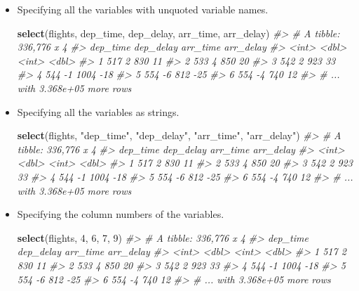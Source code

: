\documentclass[]{book}
\newenvironment{Shaded}{\begin{snugshade}}{\end{snugshade}}
\newcommand{\CommentTok}[1]{\textcolor[rgb]{0.56,0.35,0.01}{\textit{#1}}}
\newcommand{\DecValTok}[1]{\textcolor[rgb]{0.00,0.00,0.81}{#1}}
\newcommand{\KeywordTok}[1]{\textcolor[rgb]{0.13,0.29,0.53}{\textbf{#1}}}
\newcommand{\NormalTok}[1]{#1}
\newcommand{\StringTok}[1]{\textcolor[rgb]{0.31,0.60,0.02}{#1}}
\theoremstyle{plain}
\theoremstyle{remark}
\begin{document}
\begin{itemize}
\item
  Specifying all the variables with unquoted variable names.

\begin{Shaded}
\begin{Highlighting}[]
\KeywordTok{select}\NormalTok{(flights, dep_time, dep_delay, arr_time, arr_delay)}
\CommentTok{#> # A tibble: 336,776 x 4}
\CommentTok{#>   dep_time dep_delay arr_time arr_delay}
\CommentTok{#>      <int>     <dbl>    <int>     <dbl>}
\CommentTok{#> 1      517         2      830        11}
\CommentTok{#> 2      533         4      850        20}
\CommentTok{#> 3      542         2      923        33}
\CommentTok{#> 4      544        -1     1004       -18}
\CommentTok{#> 5      554        -6      812       -25}
\CommentTok{#> 6      554        -4      740        12}
\CommentTok{#> # ... with 3.368e+05 more rows}
\end{Highlighting}
\end{Shaded}
\item
  Specifying all the variables as strings.

\begin{Shaded}
\begin{Highlighting}[]
\KeywordTok{select}\NormalTok{(flights, }\StringTok{"dep_time"}\NormalTok{, }\StringTok{"dep_delay"}\NormalTok{, }\StringTok{"arr_time"}\NormalTok{, }\StringTok{"arr_delay"}\NormalTok{)}
\CommentTok{#> # A tibble: 336,776 x 4}
\CommentTok{#>   dep_time dep_delay arr_time arr_delay}
\CommentTok{#>      <int>     <dbl>    <int>     <dbl>}
\CommentTok{#> 1      517         2      830        11}
\CommentTok{#> 2      533         4      850        20}
\CommentTok{#> 3      542         2      923        33}
\CommentTok{#> 4      544        -1     1004       -18}
\CommentTok{#> 5      554        -6      812       -25}
\CommentTok{#> 6      554        -4      740        12}
\CommentTok{#> # ... with 3.368e+05 more rows}
\end{Highlighting}
\end{Shaded}
\item
  Specifying the column numbers of the variables.

\begin{Shaded}
\begin{Highlighting}[]
\KeywordTok{select}\NormalTok{(flights, }\DecValTok{4}\NormalTok{, }\DecValTok{6}\NormalTok{, }\DecValTok{7}\NormalTok{, }\DecValTok{9}\NormalTok{)}
\CommentTok{#> # A tibble: 336,776 x 4}
\CommentTok{#>   dep_time dep_delay arr_time arr_delay}
\CommentTok{#>      <int>     <dbl>    <int>     <dbl>}
\CommentTok{#> 1      517         2      830        11}
\CommentTok{#> 2      533         4      850        20}
\CommentTok{#> 3      542         2      923        33}
\CommentTok{#> 4      544        -1     1004       -18}
\CommentTok{#> 5      554        -6      812       -25}
\CommentTok{#> 6      554        -4      740        12}
\CommentTok{#> # ... with 3.368e+05 more rows}
\end{Highlighting}
\end{Shaded}


\end{itemize}
\end{document}
